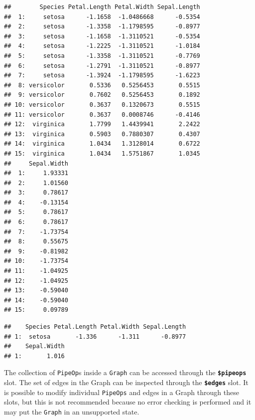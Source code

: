 \documentclass[]{article}
\newenvironment{Shaded}{\begin{snugshade}}{\end{snugshade}}
\newcommand{\DecValTok}[1]{\textcolor[rgb]{0.00,0.00,0.81}{#1}}
\newcommand{\KeywordTok}[1]{\textcolor[rgb]{0.13,0.29,0.53}{\textbf{#1}}}
\newcommand{\NormalTok}[1]{#1}
\newcommand{\OperatorTok}[1]{\textcolor[rgb]{0.81,0.36,0.00}{\textbf{#1}}}
\renewenvironment{Shaded} {\begin{snugshade}\small} {\end{snugshade}}
\begin{document}
\begin{Shaded}
\end{Shaded}

\begin{verbatim}
##        Species Petal.Length Petal.Width Sepal.Length
##  1:     setosa      -1.1658  -1.0486668      -0.5354
##  2:     setosa      -1.3358  -1.1798595      -0.8977
##  3:     setosa      -1.1658  -1.3110521      -0.5354
##  4:     setosa      -1.2225  -1.3110521      -1.0184
##  5:     setosa      -1.3358  -1.3110521      -0.7769
##  6:     setosa      -1.2791  -1.3110521      -0.8977
##  7:     setosa      -1.3924  -1.1798595      -1.6223
##  8: versicolor       0.5336   0.5256453       0.5515
##  9: versicolor       0.7602   0.5256453       0.1892
## 10: versicolor       0.3637   0.1320673       0.5515
## 11: versicolor       0.3637   0.0008746      -0.4146
## 12:  virginica       1.7799   1.4439941       2.2422
## 13:  virginica       0.5903   0.7880307       0.4307
## 14:  virginica       1.0434   1.3128014       0.6722
## 15:  virginica       1.0434   1.5751867       1.0345
##     Sepal.Width
##  1:     1.93331
##  2:     1.01560
##  3:     0.78617
##  4:    -0.13154
##  5:     0.78617
##  6:     0.78617
##  7:    -1.73754
##  8:     0.55675
##  9:    -0.81982
## 10:    -1.73754
## 11:    -1.04925
## 12:    -1.04925
## 13:    -0.59040
## 14:    -0.59040
## 15:     0.09789
\end{verbatim}

\begin{Shaded}
\end{Shaded}

\begin{verbatim}
##    Species Petal.Length Petal.Width Sepal.Length
## 1:  setosa       -1.336      -1.311      -0.8977
##    Sepal.Width
## 1:       1.016
\end{verbatim}

The collection of \texttt{PipeOp}s inside a \texttt{Graph} can be accessed through the \textbf{\texttt{\$pipeops}} slot.
The set of edges in the Graph can be inspected through the \textbf{\texttt{\$edges}} slot.
It is possible to modify individual \texttt{PipeOps} and edges in a Graph through these slots, but this is not recommended because no error checking is performed and it may put the \texttt{Graph} in an unsupported state.
\end{document}
